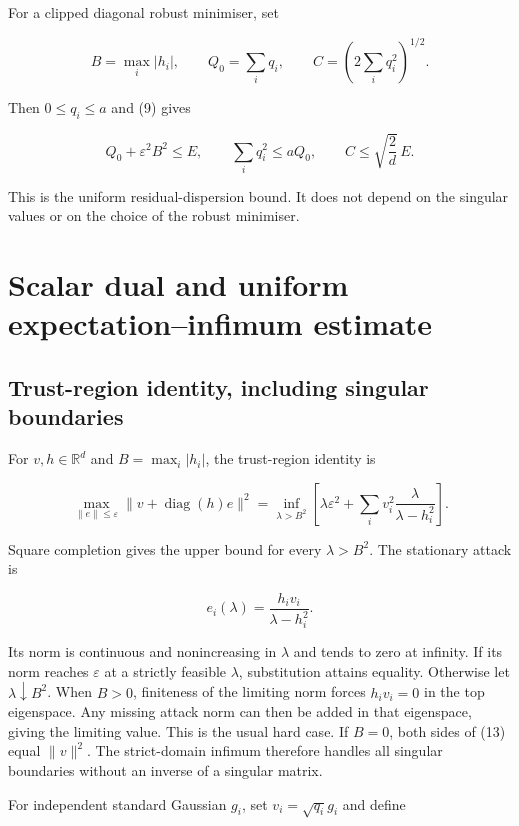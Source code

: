 \documentclass[11pt,a4paper]{article}
\begin{document}
For a clipped diagonal robust minimiser, set

\[
B=\max_i|h_i|,\qquad Q_0=\sum_iq_i,\qquad
C=\left(2\sum_iq_i^2\right)^{1/2}.
\]

Then \(0\le q_i\le a\) and (9) gives

\[
Q_0+\varepsilon^2B^2\le E,\qquad
\sum_iq_i^2\le aQ_0,\qquad
C\le\sqrt{\frac2d}\,E.
\tag{12}
\]

This is the uniform residual-dispersion bound. It does not depend on the
singular values or on the choice of the robust minimiser.

\hypertarget{scalar-dual-and-uniform-expectationinfimum-estimate}{%
\section{Scalar dual and uniform expectation--infimum
estimate}\label{scalar-dual-and-uniform-expectationinfimum-estimate}}

\hypertarget{trust-region-identity-including-singular-boundaries}{%
\subsection{Trust-region identity, including singular
boundaries}\label{trust-region-identity-including-singular-boundaries}}

For \(v,h\in\mathbb R^d\) and \(B=\max_i|h_i|\), the trust-region
identity is

\[
\max_{\|e\|\le\varepsilon}\|v+\operatorname{diag}(h)e\|^2
=\inf_{\lambda>B^2}
\left[
\lambda\varepsilon^2+
\sum_i v_i^2\frac{\lambda}{\lambda-h_i^2}
\right].
\tag{13}
\]

Square completion gives the upper bound for every \(\lambda>B^2\). The
stationary attack is

\[
e_i(\lambda)=\frac{h_i v_i}{\lambda-h_i^2}.
\]

Its norm is continuous and nonincreasing in \(\lambda\) and tends to
zero at infinity. If its norm reaches \(\varepsilon\) at a strictly
feasible \(\lambda\), substitution attains equality. Otherwise let
\(\lambda\downarrow B^2\). When \(B>0\), finiteness of the limiting norm
forces \(h_i v_i=0\) in the top eigenspace. Any missing attack norm can
then be added in that eigenspace, giving the limiting value. This is the
usual hard case. If \(B=0\), both sides of (13) equal \(\|v\|^2\). The
strict-domain infimum therefore handles all singular boundaries without
an inverse of a singular matrix.

For independent standard Gaussian \(g_i\), set \(v_i=\sqrt{q_i}g_i\) and
define
\end{document}
